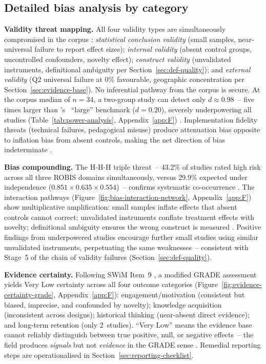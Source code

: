 \subsection{Detailed bias analysis by category} \label{sec:detailed-bias}

\textbf{Validity threat mapping.} \label{sec:validity-threats} All four validity types are simultaneously compromised in the corpus \cite{HigginsThomas2019, Cronbach1955}: \emph{statistical conclusion validity} (small samples, near-universal failure to report effect sizes); \emph{internal validity} (absent control groups, uncontrolled confounders, novelty effect); \emph{construct validity} (unvalidated instruments, definitional ambiguity per Section~\ref{sec:def-quality}); and \emph{external validity} (Q2 universal failure at 0\% favourable, geographic concentration per Section~\ref{sec:evidence-base}). No inferential pathway from the corpus is secure. At the corpus median of $n = 34$, a two-group study can detect only $d \approx 0.98$~-- five times larger than \citeauthor{Kraft2020}'s~\cite{Kraft2020} ``large'' benchmark ($d = 0.20$), severely underpowering all studies (Table~\ref{tab:power-analysis}, Appendix~\ref{app:F}) \cite{Cohen1960, Borenstein2009}. Implementation fidelity threats (technical failures, pedagogical misuse) produce attenuation bias opposite to inflation bias from absent controls, making the net direction of bias indeterminate \cite{Ioannidis2005, 58Shih2015173, 61Karsenti202027}.

\textbf{Bias compounding.} \label{sec:bias-compounding} The H-H-H triple threat~-- 43.2\% of studies rated high risk across all three ROBIS domains simultaneously, versus 29.9\% expected under independence ($0.851 \times 0.635 \times 0.554$)~-- confirms systematic co-occurrence \cite{Korniienko2025mrqs, Whiting2016}. The interaction pathways (Figure~\ref{fig:bias-interaction-network}, Appendix~\ref{app:F}) show multiplicative amplification: small samples inflate effects that absent controls cannot correct; unvalidated instruments conflate treatment effects with novelty; definitional ambiguity ensures the wrong construct is measured \cite{HigginsThomas2019, Borenstein2009}. Positive findings from underpowered studies encourage further small studies using similar unvalidated instruments, perpetuating the same weaknesses~-- consistent with Stage~5 of the chain of validity failures (Section~\ref{sec:def-quality}).

\textbf{Evidence certainty.} \label{sec:evidence-certainty} Following SWiM Item~9 \cite{Campbell2020}, a modified GRADE assessment \cite{GuyattGRADE2008, GRADE} yields Very Low certainty across all four outcome categories (Figure~\ref{fig:evidence-certainty-grade}, Appendix~\ref{app:F}): engagement/motivation (consistent but biased, imprecise, and confounded by novelty); knowledge acquisition (inconsistent across designs); historical thinking (near-absent direct evidence); and long-term retention (only 2~studies). ``Very Low'' means the evidence base cannot reliably distinguish between true positive, null, or negative effects~-- the field produces \emph{signals} but not \emph{evidence} in the GRADE sense \cite{GuyattGRADE2008}. Remedial reporting steps are operationalised in Section~\ref{sec:reporting-checklist}.

